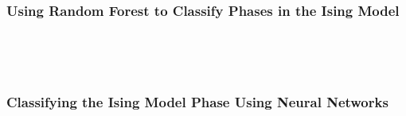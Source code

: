 \documentclass[11pt]{article}
\begin{document}
\newpage
\hypertarget{using-random-forest-to-classify-phases-in-the-ising-model}{%
\subsubsection{Using Random Forest to Classify Phases in the Ising
Model}\label{using-random-forest-to-classify-phases-in-the-ising-model4}}
    \begin{center}
    \end{center}
    { \hspace*{\fill} \\}

    \begin{center}
    \end{center}
    { \hspace*{\fill} \\}

\newpage
\hypertarget{classifying-the-ising-model-phase-using-neural-networks}{%
\subsubsection{Classifying the Ising Model Phase Using Neural
Networks}\label{classifying-the-ising-model-phase-using-neural-networks}}

    \begin{center}
    \end{center}
    
    \begin{center}
    \end{center}
    { \hspace*{\fill} \\}
    
    \begin{center}
    \end{center}
    { \hspace*{\fill} \\}
    
\end{document}
